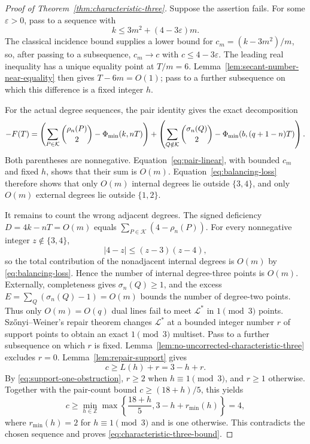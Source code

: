 \begin{proof}[Proof of Theorem~\ref{thm:characteristic-three}]
Suppose the assertion fails.  For some \(\varepsilon>0\), pass to a sequence
with
\[
 k\le3m^2+(4-3\varepsilon)m.
\]
The classical incidence bound supplies a lower bound for
\(c_m=(k-3m^2)/m\), so, after passing to a subsequence, \(c_m\to c\) with
\(c\le4-3\varepsilon\).  The leading real inequality has a unique equality
point at \(T/m=6\).  Lemma~\ref{lem:secant-number-near-equality} then gives
\(T-6m=O(1)\); pass to a further subsequence on which this difference is a
fixed integer \(h\).

For the actual degree sequences, the pair identity gives the exact
decomposition
\[
 -F(T)=
 \left(\sum_{P\in\mathcal K}\binom{\rho_n(P)}2-\Phi_{\min}(k,nT)\right)
 +\left(\sum_{Q\notin\mathcal K}\binom{\sigma_n(Q)}2
              -\Phi_{\min}(b,(q+1-n)T)\right).
\]
Both parentheses are nonnegative.  Equation~\eqref{eq:pair-linear}, with
bounded \(c_m\) and fixed \(h\), shows that their sum is \(O(m)\).
Equation~\eqref{eq:balancing-loss} therefore shows that only \(O(m)\)
internal degrees lie outside \(\{3,4\}\), and only \(O(m)\) external degrees
lie outside \(\{1,2\}\).

It remains to count the wrong adjacent degrees.  The signed deficiency
\(D=4k-nT=O(m)\) equals \(\sum_{P\in\mathcal K}(4-\rho_n(P))\).
For every nonnegative integer \(z\notin\{3,4\}\),
\[
 |4-z|\le (z-3)(z-4),
\]
so the total contribution of the nonadjacent internal degrees is \(O(m)\)
by \eqref{eq:balancing-loss}.  Hence the number of internal degree-three
points is \(O(m)\).  Externally, completeness gives \(\sigma_n(Q)\ge1\), and
the excess \(E=\sum_Q(\sigma_n(Q)-1)=O(m)\) bounds the number of degree-two
points.  Thus only \(O(m)=O(q)\) dual lines fail to meet \(\mathcal L^*\) in
\(1\pmod3\) points.
Sz\H{o}nyi--Weiner's repair theorem changes
\(\mathcal L^*\) at a bounded integer number \(r\) of support points to obtain
an exact \(1\pmod3\) multiset.  Pass to a further subsequence on which \(r\)
is fixed.  Lemma~\ref{lem:no-uncorrected-characteristic-three}
excludes \(r=0\).  Lemma~\ref{lem:repair-support} gives
\[
 c\ge L(h)+r=3-h+r.
\]
By \eqref{eq:support-one-obstruction}, \(r\ge2\) when
\(h\equiv1\pmod3\), and \(r\ge1\) otherwise.  Together with the pair-count
bound \(c\ge(18+h)/5\), this yields
\begin{equation}\label{eq:characteristic-three-minimum}
 c\ge
 \min_{h\in\mathbb Z}
 \max\left\{\frac{18+h}{5},3-h+r_{\min}(h)\right\}=4,
\end{equation}
where \(r_{\min}(h)=2\) for \(h\equiv1\pmod3\) and is one otherwise.  This
contradicts the chosen sequence and proves
\eqref{eq:characteristic-three-bound}.
\end{proof}
